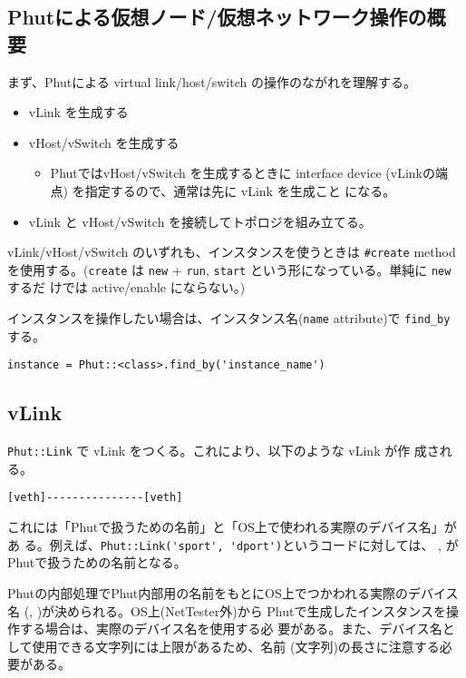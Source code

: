 \subsection{Phutによる仮想ノード/仮想ネットワーク操作の概要}

まず、Phutによる virtual link/host/switch の操作のながれを理解する。
\begin{itemize}
 \item vLink を生成する
 \item vHost/vSwitch を生成する
       \begin{itemize}
        \item PhutではvHost/vSwitch を生成するときに interface device
              (vLinkの端点) を指定するので、通常は先に vLink を生成こと
              になる。
       \end{itemize}
 \item vLink と vHost/vSwitch を接続してトポロジを組み立てる。
\end{itemize}

vLink/vHost/vSwitch のいずれも、インスタンスを使うときは \verb|#create|
method を使用する。(\verb|create| は \verb|new| +
\verb|run|, \verb|start| という形になっている。単純に \verb|new| するだ
けでは active/enable にならない。)

インスタンスを操作したい場合は、インスタンス名(\verb|name| attribute)で
\verb|find_by| する。

\begin{lstlisting}[title=\code{\#find\_by}メソッド利用例]
instance = Phut::<class>.find_by('instance_name')
\end{lstlisting}

\subsection{vLink}

\verb|Phut::Link| で vLink をつくる。これにより、以下のような vLink が作
成される。

\begin{textbox}
\begin{verbatim}
[veth]---------------[veth]
\end{verbatim}
\end{textbox}

これには「Phutで扱うための名前」と「OS上で使われる実際のデバイス名」があ
る。例えば、\verb|Phut::Link('sport', 'dport')|というコードに対しては、
, がPhutで扱うための名前となる。

Phutの内部処理でPhut内部用の名前をもとにOS上でつかわれる実際のデバイス名
(, )が決められる。OS上(NetTester外)から
Phutで生成したインスタンスを操作する場合は、実際のデバイス名を使用する必
要がある。また、デバイス名として使用できる文字列には上限があるため、名前
(文字列)の長さに注意する必要がある。

